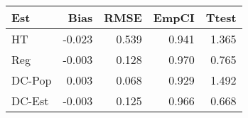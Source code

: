 
\begin{tabular}{lrrrr}
\toprule
Est & Bias & RMSE & EmpCI & Ttest\\
\midrule
HT & -0.023 & 0.539 & 0.941 & 1.365\\
Reg & -0.003 & 0.128 & 0.970 & 0.765\\
DC-Pop & 0.003 & 0.068 & 0.929 & 1.492\\
DC-Est & -0.003 & 0.125 & 0.966 & 0.668\\
\bottomrule
\end{tabular}